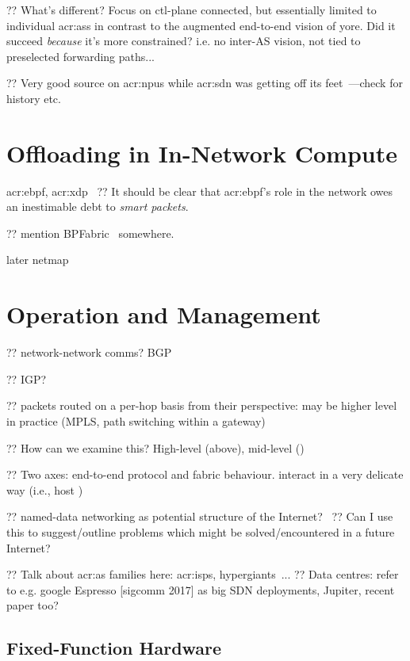 ?? What's different? Focus on ctl-plane connected, but essentially limited to individual \glspl{acr:as} in contrast to the augmented end-to-end vision of yore. Did it succeed \emph{because} it's more constrained? i.e. no inter-AS vision, not tied to preselected forwarding paths...

?? Very good source on \glspl{acr:npu} while \gls{acr:sdn} was getting off its feet~\parencite{npu-book}---check for history etc.


\section{Offloading in In-Network Compute}

\gls{acr:ebpf}, \gls{acr:xdp}~\parencite{DBLP:conf/conext/Hoiland-Jorgensen18}
?? It should be clear that \gls{acr:ebpf}'s role in the network owes an inestimable debt to \emph{smart packets}.

?? mention BPFabric~\parencite{DBLP:conf/ancs/JouetP17} somewhere.

later netmap~\parencite{DBLP:conf/usenix/Rizzo12}

\section{Operation and Management}

?? network-network comms? BGP

?? IGP?

?? packets routed on a per-hop basis from their perspective: may be higher level in practice (MPLS, path switching within a gateway)

?? How can we examine this? High-level (above), mid-level ()

?? Two axes: end-to-end protocol and fabric behaviour. interact in a very delicate way (i.e., host )

?? named-data networking as potential structure of the Internet?~\parencite{DBLP:journals/ccr/0001ABJcCPWZ14}
?? Can I use this to suggest/outline problems which might be solved/encountered in a future Internet?

?? Talk about \gls{acr:as} families here: \glspl{acr:isp}, hypergiants~\parencite{DBLP:conf/sigcomm/GigisCMNKDKS21}...
?? Data centres: refer to e.g. google Espresso [sigcomm 2017] as big SDN deployments, Jupiter, recent paper too?

\subsection{Fixed-Function Hardware}

